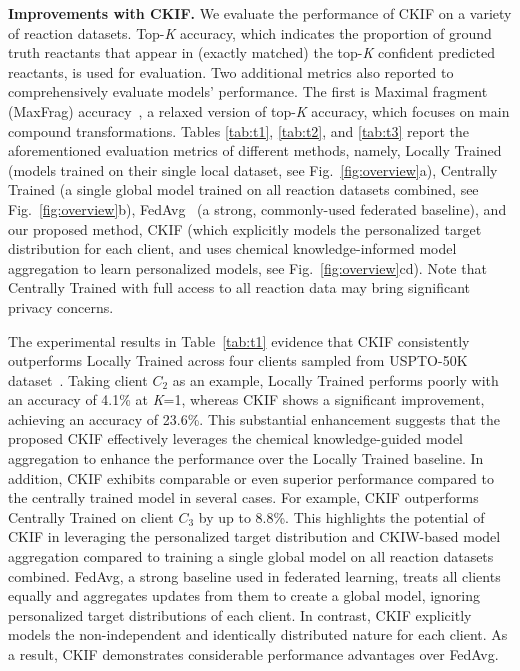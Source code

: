 \noindent\textbf{Improvements with CKIF.}
We evaluate the performance of CKIF on a variety of reaction datasets. Top-\textit{K} accuracy, which indicates the proportion of ground truth reactants that appear in (exactly matched) the top-\textit{K} confident predicted reactants, is used for evaluation. Two additional metrics also reported to comprehensively evaluate models' performance. The first is Maximal fragment (MaxFrag) accuracy~\citep{tetko2020state,zhong2022root}, a relaxed version of {top-\textit{K}} accuracy, which focuses on main compound transformations.  Tables \ref{tab:t1}, \ref{tab:t2}, and \ref{tab:t3} report the aforementioned evaluation metrics of different methods, namely, Locally Trained (models trained on their single local dataset, see Fig.~\ref{fig:overview}a), Centrally Trained (a single global model trained on all reaction datasets combined, see Fig.~\ref{fig:overview}b), FedAvg~\citep{mcmahan2017communication} (a strong, commonly-used federated baseline), and our proposed method, CKIF (which explicitly models the personalized target distribution for each client, and uses chemical knowledge-informed model aggregation to learn personalized models, see Fig.~\ref{fig:overview}cd). Note that Centrally Trained with full access to all reaction data may bring significant privacy concerns.



The experimental results in Table~\ref{tab:t1} evidence that CKIF consistently outperforms Locally Trained across four clients sampled from USPTO-50K dataset~\citep{schneider2016s}. Taking client $C_2$ as an example, Locally Trained performs poorly with an accuracy of 4.1\% at \textit{K}=1, whereas CKIF shows a significant improvement, achieving an accuracy of 23.6\%. This substantial enhancement suggests that the proposed CKIF effectively leverages the chemical knowledge-guided model aggregation to enhance the performance over the Locally Trained baseline. In addition, CKIF exhibits comparable or even superior performance compared to the centrally trained model in several cases. For example, CKIF outperforms Centrally Trained on client $C_3$ by up to 8.8\%. This highlights the potential of CKIF in leveraging the personalized target distribution and CKIW-based model aggregation  compared to training a single global model on all reaction datasets combined. FedAvg, a strong baseline used in federated learning, treats all clients equally and aggregates updates from them to create a global model, ignoring personalized target distributions of each client. In contrast, CKIF explicitly models the non-independent and identically distributed nature for each client. As a result, CKIF demonstrates considerable performance advantages over FedAvg.





